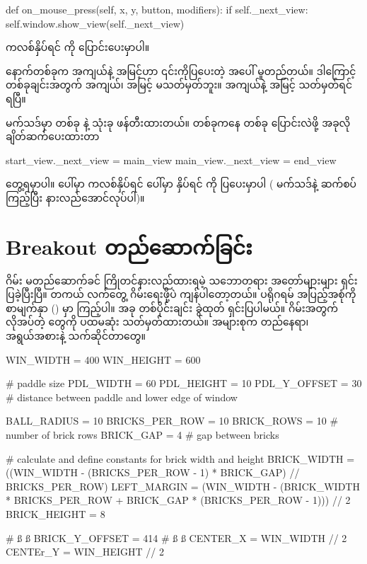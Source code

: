 %
\begin{py}
def on_mouse_press(self, x, y, button, modifiers):
    if self._next_view:
        self.window.show_view(self._next_view)
\end{py}
%
ကလစ်နှိပ်ရင်  ကို ပြောင်းပေးမှာပါ။ 

နောက်တစ်ခုက  အကျယ်နဲ့ အမြင့်ဟာ ၎င်းကိုပြပေးတဲ့  အပေါ် မူတည်တယ်။ ဒါကြောင့်    တစ်ခုချင်းအတွက် အကျယ်၊ အမြင့် မသတ်မှတ်ဘူး။  အကျယ်နဲ့ အမြင့် သတ်မှတ်ရင် ရပြီ။

 မက်သဒ်မှာ  တစ်ခု နဲ့  သုံးခု ဖန်တီးထားတယ်။  တစ်ခုကနေ တစ်ခု ပြောင်းလဲဖို့ အခုလို ချိတ်ဆက်ပေးထားတာ
%
\begin{py}
start_view._next_view = main_view
main_view._next_view = end_view
\end{py}
%
တွေ့ရမှာပါ။  ပေါ်မှာ ကလစ်နှိပ်ရင် \fEn{,}  ပေါ်မှာ နှိပ်ရင်  ကို ပြပေးမှာပါ ( မက်သဒ်နဲ့ ဆက်စပ်ကြည့်ပြီး နားလည်အောင်လုပ်ပါ)။

\section{Breakout တည်ဆောက်ခြင်း}
ဂိမ်း မတည်ဆောက်ခင် ကြိုတင်နားလည်ထားရမဲ့  သဘောတရား အတော်များများ ရှင်းပြခဲ့ပြီးပြီ။ တကယ် လက်တွေ့ ဂိမ်းရေးဖို့ပဲ ကျန်ပါတော့တယ်။  ပရိုဂရမ် အပြည့်အစုံကို စာမျက်နှာ (\fRefNo{\pageref{lst:breakoutfull}}) မှာ ကြည့်ပါ။ အခု တစ်ပိုင်းချင်း ခွဲထုတ် ရှင်းပြပါမယ်။ ဂိမ်းအတွက် လိုအပ်တဲ့  တွေကို ပထမဆုံး သတ်မှတ်ထားတယ်။ အများစုက တည်နေရာ၊ အရွယ်အစားနဲ့ သက်ဆိုင်တာတွေ။


%
\begin{py}
WIN_WIDTH = 400
WIN_HEIGHT = 600

# paddle size
PDL_WIDTH = 60
PDL_HEIGHT = 10
PDL_Y_OFFSET = 30    # distance between paddle and lower edge of window

BALL_RADIUS = 10
BRICKS_PER_ROW = 10
BRICK_ROWS = 10      # number of brick rows
BRICK_GAP = 4        # gap between bricks

# calculate and define constants for brick width and height
BRICK_WIDTH = ((WIN_WIDTH - (BRICKS_PER_ROW - 1) * BRICK_GAP)
               // BRICKS_PER_ROW)
LEFT_MARGIN = (WIN_WIDTH - (BRICK_WIDTH * BRICKS_PER_ROW +
                            BRICK_GAP * (BRICKS_PER_ROW - 1))) // 2
BRICK_HEIGHT = 8

# ß  ß
BRICK_Y_OFFSET = 414
# ß  ß
CENTER_X = WIN_WIDTH // 2
CENTEr_Y = WIN_HEIGHT // 2
\end{py}
%


